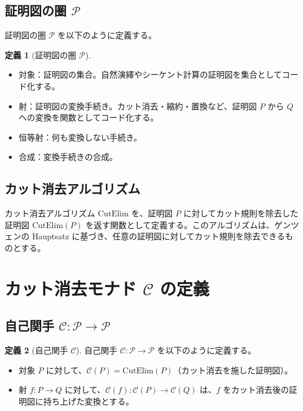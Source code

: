 \documentclass[11pt,a4paper]{article}
\theoremstyle{definition}
\newtheorem{definition}{定義}[section]
\newcommand{\monad}{\mathcal{C}}
\newcommand{\proofs}{\mathcal{P}}
\newcommand{\cutelim}{\mathrm{CutElim}}
\begin{document}
\subsection{証明図の圏 $\proofs$}

証明図の圏 $\proofs$ を以下のように定義する。

\begin{definition}[証明図の圏 $\proofs$]\leavevmode\\
\begin{itemize}
  \item 対象：証明図の集合。自然演繹やシーケント計算の証明図を集合としてコード化する。
  \item 射：証明図の変換手続き。カット消去・縮約・置換など、証明図 $P$ から $Q$ への変換を関数としてコード化する。
  \item 恒等射：何も変換しない手続き。
  \item 合成：変換手続きの合成。
\end{itemize}
\end{definition}

\subsection{カット消去アルゴリズム}

カット消去アルゴリズム $\cutelim$ を、証明図 $P$ に対してカット規則を除去した証明図 $\cutelim(P)$ を返す関数として定義する。このアルゴリズムは、ゲンツェンの Hauptsatz に基づき、任意の証明図に対してカット規則を除去できるものとする。

\section{カット消去モナド $\monad$ の定義}

\subsection{自己関手 $\monad : \proofs \to \proofs$}

\begin{definition}[自己関手 $\monad$]
自己関手 $\monad : \proofs \to \proofs$ を以下のように定義する。
\begin{itemize}
  \item 対象 $P$ に対して、$\monad(P) = \cutelim(P)$（カット消去を施した証明図）。
  \item 射 $f : P \to Q$ に対して、$\monad(f) : \monad(P) \to \monad(Q)$ は、$f$ をカット消去後の証明図に持ち上げた変換とする。
\end{itemize}
\end{definition}
\end{document}
